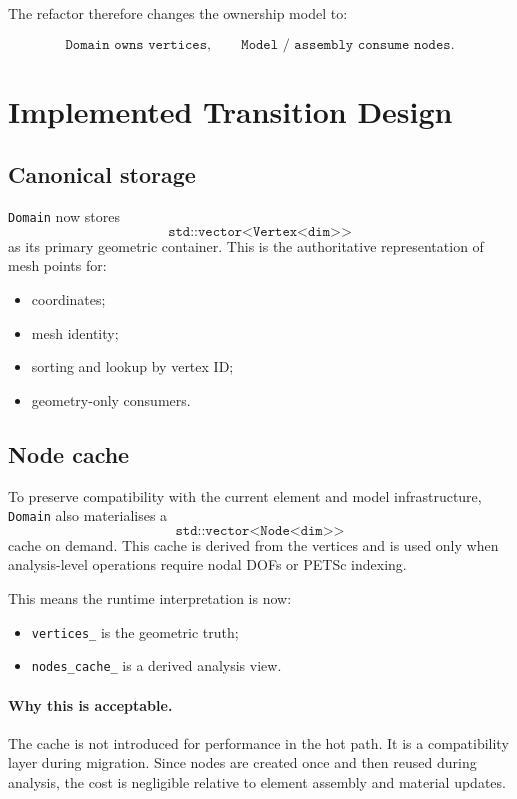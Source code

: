 The refactor therefore changes the ownership model to:

\[
\texttt{Domain owns vertices}, \qquad
\texttt{Model / assembly consume nodes}.
\]


\section{Implemented Transition Design}
\label{sec:domain-vertex-transition-design}

\subsection{Canonical storage}

\texttt{Domain} now stores
\[
\texttt{std::vector<Vertex<dim>>}
\]
as its primary geometric container.  This is the authoritative representation
of mesh points for:

\begin{itemize}[nosep]
  \item coordinates;
  \item mesh identity;
  \item sorting and lookup by vertex ID;
  \item geometry-only consumers.
\end{itemize}

\subsection{Node cache}

To preserve compatibility with the current element and model infrastructure,
\texttt{Domain} also materialises a
\[
\texttt{std::vector<Node<dim>>}
\]
cache on demand.  This cache is derived from the vertices and is used only when
analysis-level operations require nodal DOFs or PETSc indexing.

This means the runtime interpretation is now:

\begin{itemize}[nosep]
  \item \texttt{vertices\_} is the geometric truth;
  \item \texttt{nodes\_cache\_} is a derived analysis view.
\end{itemize}

\paragraph{Why this is acceptable.}
The cache is not introduced for performance in the hot path.  It is a
compatibility layer during migration.  Since nodes are created once and then
reused during analysis, the cost is negligible relative to element assembly and
material updates.

